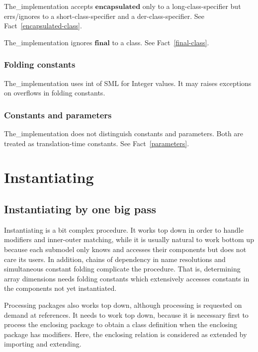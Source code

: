 \documentclass[10pt,b5paper]{article}
\begin{document}
The_implementation accepts $\mathbf{encapsulated}$ only to a
long-class-specifier but errs/ignores to a short-class-specifier and a
der-class-specifier.  See Fact~\ref{encapsulated-class}.

The_implementation ignores $\mathbf{final}$ to a class.  See
Fact~\ref{final-class}.

\subsubsection*{Folding constants}

The_implementation uses int of SML for Integer values.  It may raises
exceptions on overflows in folding constants.

\subsubsection*{Constants and parameters}

The_implementation does not distinguish constants and parameters.
Both are treated as translation-time constants.  See
Fact~\ref{parameters}.


\section{Instantiating}


\subsection{Instantiating by one big pass}

Instantiating is a bit complex procedure.  It works top down in order
to handle modifiers and inner-outer matching, while it is usually
natural to work bottom up because each submodel only knows and
accesses their components but does not care its users.  In addition,
chains of dependency in name resolutions and simultaneous constant
folding complicate the procedure.  That is, determining array
dimensions needs folding constants which extensively accesses
constants in the components not yet instantiated.

Processing packages also works top down, although processing is
requested on demand at references.  It needs to work top down, because
it is necessary first to process the enclosing package to obtain a
class definition when the enclosing package has modifiers.  Here, the
enclosing relation is considered as extended by importing and
extending.
\end{document}

